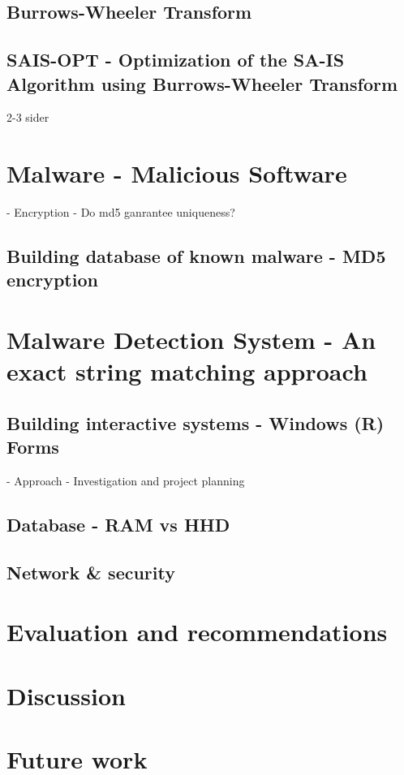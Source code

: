 \documentclass[12pt]{article} %
\begin{document}
\subsection{Burrows-Wheeler Transform}
\subsection{SAIS-OPT - Optimization of the SA-IS Algorithm using Burrows-Wheeler Transform}
2-3 sider

\section{Malware - Malicious Software}

- Encryption
- Do md5 ganrantee uniqueness?

\subsection{Building database of known malware - MD5 encryption}

\section{Malware Detection System - An exact string matching approach}
\subsection{Building interactive systems - Windows (R) Forms}

- Approach
- Investigation and project planning

\subsection{Database - RAM vs HHD}
\subsection{Network & security}

\section{Evaluation and recommendations}

\section{Discussion}

\section{Future work}
\end{document}
